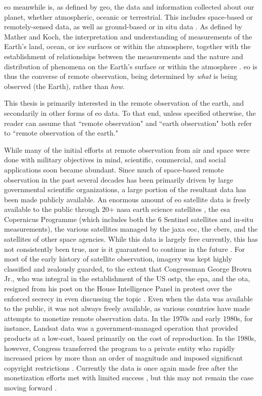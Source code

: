 \Acf{eo} meanwhile is, as defined by \ac{geo}, the data and information collected about our planet, whether atmospheric, oceanic or terrestrial. This includes space-based or remotely-sensed data, as well as ground-based or in situ data \cite{grouponearthobservationsGEOGlance2019}. As defined by Mather and Koch, the interpretation and understanding of measurements of the Earth's land, ocean, or ice surfaces or within the atmosphere, together with the establishment of relationships between the measurements and the nature and distribution of phenomena on the Earth's surface or within the atmosphere \cite{matherComputerProcessingRemotelySensed2011}. \ac{eo} is thus the converse of remote observation, being determined by \textit{what} is being observed (the Earth), rather than \textit{how}. 

This thesis is primarily interested in the remote observation of the earth, and secondarily in other forms of \ac{eo} data. To that end, unless specified otherwise, the reader can assume that ``remote observation" and ``earth observation" both refer to ``remote observation of the earth."

While many of the initial efforts at remote observation from air and space were done with military objectives in mind, scientific, commercial, and social applications soon became abundant. Since much of space-based remote observation in the past several decades has been primarily driven by large governmental scientific organizations, a large portion of the resultant data has been made publicly available. An enormous amount of \ac{eo} satellite data is freely available to the public through 20+ \ac{nasa} earth science satellites \cite{shirahNASAEarthObserving2017}, the \ac{esa} Copernicus Programme (which includes both the 6 Sentinel satellites and in-situ measurements), the various satellites managed by the \ac{jaxa} \ac{eoc}, the \ac{cbers}, and the satellites of other space agencies. While this data is largely free currently, this has not consistently been true, nor is it guaranteed to continue in the future \cite{borowitzOpenSpaceGlobal2017}. For most of the early history of satellite observation, imagery was kept highly classified and zealously guarded, to the extent that Congressman George Brown Jr., who was integral in the establishment of the US \ac{ostp}, the \ac{epa}, and the \ac{ota}, resigned from his post on the House Intelligence Panel in protest over the enforced secrecy in even discussing the topic \cite{healyRepBrownQuits1987, barry1992mappings}. Even when the data was available to the public, it was not always freely available, as various countries have made attempts to monetize remote observation data. In the 1970s and early 1980s, for instance, Landsat data was a government-managed operation that provided products at a low-cost, based primarily on the cost of reproduction. In the 1980s, however, Congress transferred the program to a private entity who rapidly increased prices by more than an order of magnitude and imposed significant copyright restrictions \cite{mchaffieManufacturingMetaphors1994}. Currently the data is once again made free after the monetization efforts met with limited success \cite{waldropLandsatCommercializationStumbles1987}, but this may not remain the case moving forward \cite{popkinUSGovernmentConsiders2018}.

